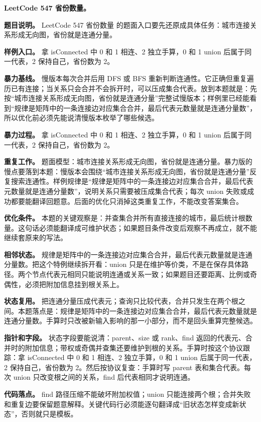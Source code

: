 \noindent\textbf{LeetCode 547 省份数量。}

\textbf{题目说明。} LeetCode 547 省份数量 的题面入口要先还原成具体任务：城市连接关系形成无向图，省份就是连通分量。

\textbf{样例入口。} 拿 isConnected 中 0 和 1 相连、2 独立手算，0 和 1 union 后属于同一代表，2 保持自己，省份数为 2。

\textbf{暴力基线。} 慢版本每次合并后用 DFS 或 BFS 重新判断连通性。它正确但重复遍历已有连接；当关系只会合并不会拆开时，可以压成集合代表。放到本题就是：先按“城市连接关系形成无向图，省份就是连通分量”完整试慢版本；样例里已经能看到“规律是矩阵中的一条连接边对应集合合并，最后代表元数量就是连通分量数”，所以优化前必须先能说清慢版本枚举了哪些候选。

\textbf{暴力过程。} 拿 isConnected 中 0 和 1 相连、2 独立手算，0 和 1 union 后属于同一代表，2 保持自己，省份数为 2。

\textbf{重复工作。} 题面模型：城市连接关系形成无向图，省份就是连通分量。暴力版的慢点要落到本题：慢版本会围绕“城市连接关系形成无向图，省份就是连通分量”反复搜索连通性。样例规律是“规律是矩阵中的一条连接边对应集合合并，最后代表元数量就是连通分量数”，说明关系只需要被压成集合代表；每次 union 失败或成功都要能翻译回题意。后面的优化只消掉这类重复工作，不能改变答案集合。

\textbf{优化条件。} 本题的关键观察是：并查集合并所有直接连接的城市，最后统计根数量。这句话必须能翻译成可维护状态；如果题目条件改变后观察不再成立，就不能继续套原来的写法。

\textbf{相邻状态。} 规律是矩阵中的一条连接边对应集合合并，最后代表元数量就是连通分量数。把这个特例继续拆开看：union 只是在维护等价类，不是在保存具体路径。两个节点代表元相同只能说明连通或关系一致；如果题目还要距离、比例或奇偶性，必须把附加信息挂到根关系上。

\textbf{状态复用。} 把连通分量压成代表元；查询只比较代表，合并只发生在两个根之间。本题落点是：规律是矩阵中的一条连接边对应集合合并，最后代表元数量就是连通分量数。手算时只改被新输入影响的那一小部分，而不是回头重算完整候选。

\textbf{指针和字段。} 状态字段要能说清：parent、size 或 rank、find 返回的代表元、合并时的附加信息；带权或奇偶并查集还要维护到根的关系。手算时按这个协议跟踪：拿 isConnected 中 0 和 1 相连、2 独立手算，0 和 1 union 后属于同一代表，2 保持自己，省份数为 2。然后按协议复查：手算时写 parent 表和集合代表。每次 union 只改变根之间的关系，find 后代表相同才说明连通。

\textbf{代码落点。} find 路径压缩不能破坏附加权值；union 只能连接两个根；合并失败和重复边要保留题意解释。关键代码行必须能逐句翻译成“旧状态怎样变成新状态”，否则就只是模板。


